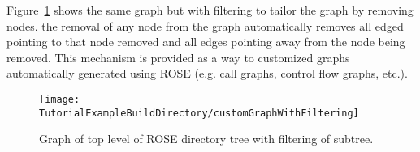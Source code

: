 Figure~\ref{tutorial:exampleCustomGraphWithFiltering} shows the same graph
but with filtering to tailor the graph by removing nodes.  the removal of any
node from the graph automatically removes all edged pointing to that node removed
and all edges pointing away from the node being removed.  This mechanism is
provided as a way to customized graphs automatically generated using ROSE
(e.g. call graphs, control flow graphs, etc.).

\begin{figure}[!h]
\texttt{[image: \\TutorialExampleBuildDirectory/customGraphWithFiltering]}
\caption{Graph of top level of ROSE directory tree with filtering of subtree.}
\label{tutorial:exampleCustomGraphWithFiltering}
\end{figure}

